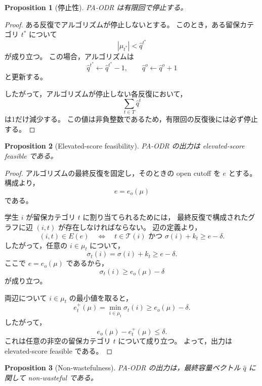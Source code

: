 \documentclass[
  12pt,
  a4paper,
  oneside,
  onecolumn,
  titlepage,
  final
]{jsarticle}
\newtheorem{proposition}{Proposition}
\newcommand{\1}{\mathbf{1}}
\begin{document}
\begin{proposition}[停止性]
\label{prop:pa-odr-termination}
\textsc{PA-ODR} は有限回で停止する。
\end{proposition}

\begin{proof}
ある反復でアルゴリズムが停止しないとする。
このとき，ある留保カテゴリ $t^\ast$ について
\[
    |\mu_{t^\ast}|<\hat q^{t^\ast}
\]
が成り立つ。
この場合，アルゴリズムは
\[
    \hat q^{t^\ast}\gets \hat q^{t^\ast}-1,
    \qquad
    \hat q^o\gets \hat q^o+1
\]
と更新する。

したがって，アルゴリズムが停止しない各反復において，
\[
    \sum_{t\in T}\hat q^t
\]
は1だけ減少する。
この値は非負整数であるため，有限回の反復後には必ず停止する。
\end{proof}

\begin{proposition}[Elevated-score feasibility]
\label{prop:pa-odr-score-feasible}
\textsc{PA-ODR} の出力は elevated-score feasible である。
\end{proposition}

\begin{proof}
アルゴリズムの最終反復を固定し，そのときの open cutoff を $e$ とする。
構成より，
\[
    e=e_o(\mu)
\]
である。

学生 $i$ が留保カテゴリ $t$ に割り当てられるためには，
最終反復で構成されたグラフに辺 $(i,t)$ が存在しなければならない。
辺の定義より，
\[
    (i,t)\in E(e)
    \quad\Longleftrightarrow\quad
    t\in\mathcal T(i)
    \text{ かつ }
    \sigma(i)+k_t\ge e-\delta.
\]
したがって，任意の $i\in\mu_t$ について，
\[
    \sigma_t(i)=\sigma(i)+k_t\ge e-\delta.
\]
ここで $e=e_o(\mu)$ であるから，
\[
    \sigma_t(i)\ge e_o(\mu)-\delta
\]
が成り立つ。

両辺について $i\in\mu_t$ の最小値を取ると，
\[
    e_t^+(\mu)
    =
    \min_{i\in\mu_t}\sigma_t(i)
    \ge
    e_o(\mu)-\delta.
\]
したがって，
\[
    e_o(\mu)-e_t^+(\mu)\le\delta.
\]
これは任意の非空の留保カテゴリ $t$ について成り立つ。
よって，出力は elevated-score feasible である。
\end{proof}

\begin{proposition}[Non-wastefulness]
\label{prop:pa-odr-nonwaste}
\textsc{PA-ODR} の出力は，最終容量ベクトル $\hat q$ に関して
non-wasteful である。
\end{proposition}
\end{document}

